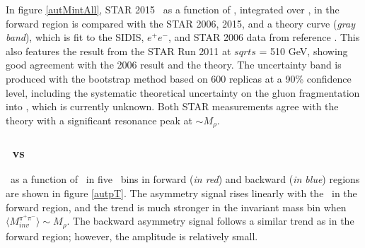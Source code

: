 In figure \ref{autMintAll}, STAR 2015 \aut\ as a function of \minv, integrated over \ptp, in the forward region is compared with the STAR 2006, 2015, and a theory curve (\emph{gray band}), which is fit to the SIDIS, $e^+e^-$, and STAR 2006 data from reference \cite{mradici}. This also features the result from the STAR Run 2011 at $sqrt{s}$ = 510 GeV, showing good agreement with the 2006 result and the theory. The uncertainty band is produced with the bootstrap method based on 600 replicas at a 90\% confidence level, including the systematic theoretical uncertainty on the gluon fragmentation into \pip, which is currently unknown. Both STAR measurements agree with the theory with a significant resonance peak at \minv $\sim M_\rho$.

\subsubsection{\aut\ vs \ptp}

\aut\ as a function of \ptp\ in five \minv\ bins in forward (\emph{in red}) and backward (\emph{in blue}) regions are shown in figure \ref{autpT}. The asymmetry signal rises linearly with the \ptp\ in the forward region, and the trend is much stronger in the invariant mass bin when $\langle M_{inv}^{\pi^+\pi^-}\rangle \sim M_\rho$. The backward asymmetry signal follows a similar trend as in the forward region; however, the amplitude is relatively small.

